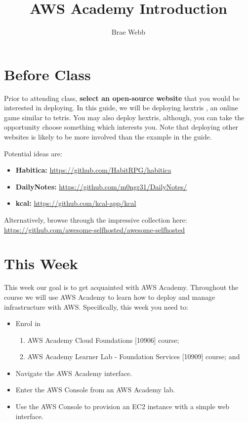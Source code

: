 \documentclass{csse4400}
\title{AWS Academy Introduction}
\author{Brae Webb}
\date{\week{1}}
\begin{document}
\maketitle

\section{Before Class}
Prior to attending class, \textbf{select an open-source website} that you would be interested in deploying.
In this guide, we will be deploying hextris \cite{hextris}, an online game similar to tetris.
You may also deploy hextris, although,
you can take the opportunity choose something which interests you.
Note that deploying other websites is likely to be more involved than the example in the guide.

Potential ideas are:
\begin{itemize}
    \item \textbf{Habitica:} \url{https://github.com/HabitRPG/habitica}
    \item \textbf{DailyNotes:} \url{https://github.com/m0ngr31/DailyNotes/}
    \item \textbf{kcal:} \url{https://github.com/kcal-app/kcal} 
\end{itemize}


\noindent Alternatively, browse through the impressive collection here:\\ \url{https://github.com/awesome-selfhosted/awesome-selfhosted}

\section{This Week}
This week our goal is to get acquainted with AWS Academy.
Throughout the course we will use AWS Academy to learn how to deploy and manage infrastructure with AWS.
Specifically, this week you need to:
\begin{itemize}
    \item Enrol in
    \begin{enumerate}
        \item AWS Academy Cloud Foundations [10906] course;
        \item AWS Academy Learner Lab - Foundation Services [10909] course; and
    \end{enumerate}
    \item Navigate the AWS Academy interface.
    \item Enter the AWS Console from an AWS Academy lab.
    \item Use the AWS Console to provision an EC2 instance with a simple web interface.
\end{itemize}
\end{document}
